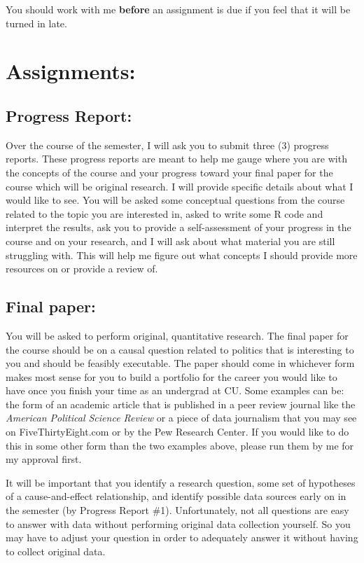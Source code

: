 \documentclass[11pt, a4paper]{article}
\begin{document}
You should work with me \textbf{before} an assignment is due if you feel that it will be turned in late.

\section*{Assignments:}
    \subsection*{Progress Report:}
    
    Over the course of the semester, I will ask you to submit three (3) progress reports. These progress reports are meant to help me gauge where you are with the concepts of the course and your progress toward your final paper for the course which will be original research. I will provide specific details about what I would like to see. You will be asked some conceptual questions from the course related to the topic you are interested in, asked to write some R code and interpret the results, ask you to provide a self-assessment of your progress in the course and on your research, and I will ask about what material you are still struggling with. This will help me figure out what concepts I should provide more resources on or provide a review of.
    \subsection*{Final paper:} 
    
    You will be asked to perform original, quantitative research. The final paper for the course should be on a causal question related to politics that is interesting to you and should be feasibly executable. The paper should come in whichever form makes most sense for you to build a portfolio for the career you would like to have once you finish your time as an undergrad at CU. Some examples can be: the form of an academic article that is published in a peer review journal like the \textit{American Political Science Review} or a piece of data journalism that you may see on FiveThirtyEight.com or by the Pew Research Center. If you would like to do this in some other form than the two examples above, please run them by me for my approval first.

    It will be important that you identify a research question, some set of hypotheses of a cause-and-effect relationship, and identify possible data sources early on in the semester (by Progress Report \#1). Unfortunately, not all questions are easy to answer with data without performing original data collection yourself. So you may have to adjust your question in order to adequately answer it without having to collect original data. 
\end{document}
